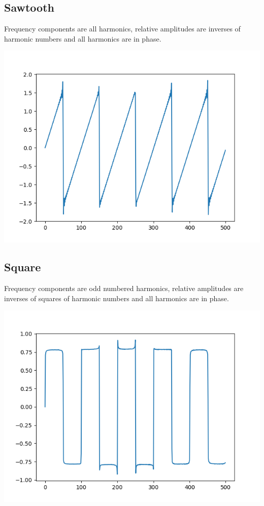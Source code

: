 \documentclass{article}
\begin{document}
\subsection{Sawtooth}
Frequency components are all harmonics, relative amplitudes are inverses of harmonic numbers and all harmonics are in phase.


\begin{center}
    \includegraphics{saw.png}
\end{center}

\subsection{Square}
Frequency components are odd numbered harmonics, relative amplitudes are inverses of squares of harmonic numbers and all harmonics are in phase.

\begin{center}
    \includegraphics{square.png}
\end{center}
\end{document}
